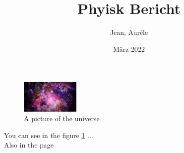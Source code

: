 \documentclass{report}
\title{Phyisk Bericht}
\author{Jean, Aurèle}
\date{März 2022}
\begin{document}
\maketitle
\begin{figure}[h]
    \centering
    \includegraphics[width=0.25\textwidth]{universe.jpg}
    \caption{A picture of the universe}
    \label{fig:universe1}
\end{figure}
You can see in the figure \ref{fig:universe1} ... \\
Also in the page \pageref{fig:universe1}
\end{document}
